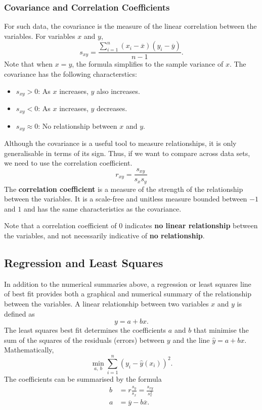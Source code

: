 \documentclass{article}
\begin{document}
\subsubsection{Covariance and Correlation Coefficients}
For such data, the covariance is the measure of the linear correlation between the variables.
For variables \(x\) and \(y\),
\begin{equation*}
    s_{xy} = \frac{\sum_{i = 1}^n \left( x_i - \overline{x} \right) \left( y_i - \overline{y} \right)}{n - 1}.
\end{equation*}
Note that when \(x = y\), the formula simplifies to the sample variance of \(x\).
The covariance has the following characterstics:
\begin{itemize}
    \item \(s_{xy} > 0\): As \(x\) increases, \(y\) also increases.
    \item \(s_{xy} < 0\): As \(x\) increases, \(y\) decreases.
    \item \(s_{xy} \approx 0\): No relationship between \(x\) and \(y\).
\end{itemize}
Although the covariance is a useful tool to measure relationships, it is
only generalisable in terms of its sign. Thus, if we want to compare across
data sets, we need to use the correlation coefficient.
\begin{equation*}
    r_{xy} = \frac{s_{xy}}{s_x s_y}
\end{equation*}
The \textbf{correlation coefficient} is a measure of the strength of the relationship between the variables.
It is a scale-free and unitless measure bounded between \(-1\) and \(1\) and
has the same characteristics as the covariance.

Note that a correlation coefficient of \(0\)
indicates \textbf{no linear relationship} between the variables, and not necessarily indicative of \textbf{no relationship}.
\subsection{Regression and Least Squares}
In addition to the numerical summaries above, a regression or least squares line of
best fit provides both a graphical and numerical summary of the relationship between the variables.
A linear relationship between two variables \(x\) and \(y\) is defined as
\begin{equation*}
    y = a + b x.
\end{equation*}
The least squares best fit determines the coefficients \(a\) and \(b\) that minimise the sum of the squares of the residuals
(errors) between \(y\) and the line \(\hat{y} = a + b x\). Mathematically,
\begin{equation*}
    \min_{a,\: b} \sum_{i = 1}^n \left( y_i - \hat{y}\left( x_i \right) \right)^2.
\end{equation*}
The coefficients can be summarised by the formula
\begin{align*}
    b & = r \frac{s_y}{s_x} = \frac{s_{xy}}{s_x^2} \\
    a & = \overline{y} - b \overline{x}.
\end{align*}
\end{document}
